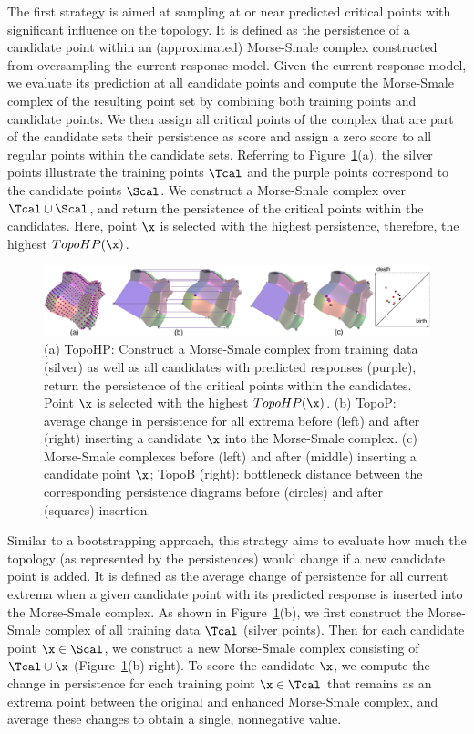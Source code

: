  The first strategy is aimed at sampling at or near predicted critical points with significant influence on the topology.
%
It is defined as the persistence of a candidate point within an (approximated) Morse-Smale complex constructed from oversampling the current response model.
%
Given the current response model, we evaluate its prediction at all candidate points and compute the Morse-Smale complex of the resulting point set by combining both training points and candidate points.
%
We then assign all critical points of the complex that are part of the candidate sets their persistence as score and assign a zero score to all regular points within the candidate sets.
%
Referring to Figure~\ref{fig:topo-all}(a), the silver points illustrate the training points $\Tcal$ and the purple points correspond to the candidate points $\Scal$.
%
We construct a Morse-Smale complex over $\Tcal \cup \Scal$, and return the persistence of the critical points within the candidates.
%
Here, point $\x$ is selected with the highest persistence, therefore, the highest $TopoHP(\x)$.

\begin{figure}[!ht]
\begin{center}
\includegraphics[width=1.0\linewidth]{figs/chap5/topo-all}
\caption{(a) TopoHP: Construct a Morse-Smale complex from training data (silver) as well as all candidates with predicted responses (purple), return the persistence of the critical points within the candidates.
%
Point $\x$ is selected with the highest $TopoHP(\x)$.
%
(b) TopoP: average change in persistence for all extrema before (left) and after (right) inserting a candidate $\x$ into the Morse-Smale complex.
%
(c) Morse-Smale complexes before (left) and after (middle) inserting a candidate point $\x$;
%
TopoB (right): bottleneck distance between the corresponding persistence diagrams before (circles) and after (squares) insertion.}
\label{fig:topo-all}
\end{center}
\end{figure}

 Similar to a bootstrapping approach, this strategy aims to evaluate how much the topology (as represented by the persistences) would change if a new candidate point is added.
%
It is defined as the average change of persistence for all current extrema when a given candidate point with its predicted response is inserted into the Morse-Smale complex.
%
As shown in Figure~\ref{fig:topo-all}(b), we first construct the Morse-Smale complex of all training data $\Tcal$ (silver points).
%
Then for each candidate point $\x \in \Scal$, we construct a new Morse-Smale complex consisting of $\Tcal \cup \x$ (Figure~\ref{fig:topo-all}(b) right).
%
To score the candidate $\x$, we compute the change in persistence for each training point $\x \in \Tcal$ that remains as an extrema point between the original and enhanced Morse-Smale complex, and average these changes to obtain a single, nonnegative value.

